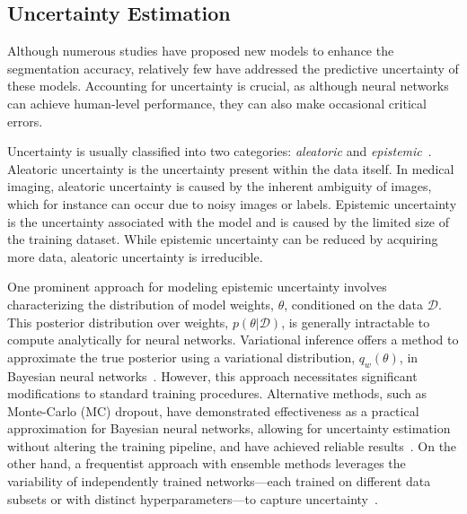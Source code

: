 

\subsection{Uncertainty Estimation}

Although numerous studies have proposed new models to enhance the segmentation accuracy, relatively few have addressed the predictive uncertainty of these models. Accounting for uncertainty is crucial, as although neural networks can achieve human-level performance, they can also make occasional critical errors.


Uncertainty is usually classified into two categories: {\em aleatoric} and {\em epistemic}~\cite{bayesianCV}. Aleatoric uncertainty is the uncertainty present within the data itself. In medical imaging, aleatoric uncertainty is caused by the inherent ambiguity of images, which for instance can occur due to noisy images or labels.
Epistemic uncertainty is the uncertainty associated with the model and is caused by the limited size of the training dataset. While epistemic uncertainty can be reduced by acquiring more data, 
aleatoric uncertainty is irreducible.



One prominent approach for modeling epistemic uncertainty involves characterizing the distribution of model weights, $\theta$, conditioned on the data $\mathcal{D}$. This posterior distribution over weights, $p(\theta|\mathcal{D})$, is generally intractable to compute analytically for neural networks. Variational inference offers a method to approximate the true posterior using a variational distribution, $q_w(\theta)$, in Bayesian neural networks~\cite{pmlr-v37-blundell15}. However, this approach necessitates significant modifications to standard training procedures. Alternative methods, such as Monte-Carlo (MC) dropout, have demonstrated effectiveness as a practical approximation for Bayesian neural networks, allowing for uncertainty estimation without altering the training pipeline, and have achieved reliable results~\cite{Gal_2016_bayesNN, Gal_2015_BayesianCNN}. On the other hand, a frequentist approach with ensemble methods leverages the variability of independently trained networks—each trained on different data subsets or with distinct hyperparameters—to capture uncertainty~\cite{ensembles}.



